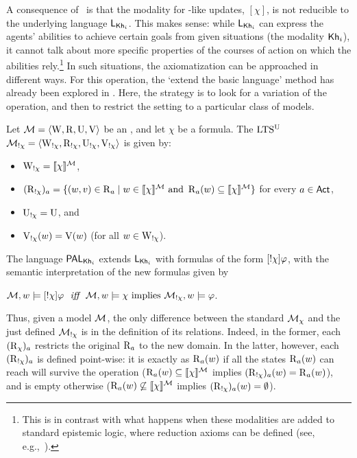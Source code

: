 A consequence of~ is that the modality for \PAL-like updates, $[\chi]$, is not reducible to the underlying language $\mathsf{L}_{{\sf Kh}_i}$. This makes sense: while $\mathsf{L}_{{\sf Kh}_i}$ can express the agents' abilities to achieve certain goals from given situations (the modality ${\sf Kh}_i$), it cannot talk about more specific properties of the courses of action on which the abilities rely.\footnote{This is in contrast with what happens when these modalities are added to standard epistemic logic, where reduction axioms can be defined (see, e.g.,~\cite{DELbook}).} In such situations, the axiomatization can be approached in different ways. For this operation, the `extend the basic language' method has already been explored in \cite{Wang2016}. Here, the strategy is to look for a variation of the operation, and then to restrict the setting to a particular class of models.

\medskip

\begin{definition}\label{def:annupdate}\label{def:pakhsyntax}
Let $\mathcal{M} = \langle \operatorname{W}, \operatorname{R}, \operatorname{U}, \operatorname{V} \rangle$ be an \ults, and let $\chi$ be a formula. The $\textup{LTS$^\text{\textup{U}}$}$ $\mathcal{M}_{!\chi} = \langle \operatorname{W}_{!\chi}, \operatorname{R}_{!\chi}, \operatorname{U}_{!\chi}, \operatorname{V}_{!\chi} \rangle$ is given by:
\begin{itemize}
\item $\operatorname{W}_{!\chi} = \llbracket \chi \rrbracket^{\mathcal{M}}$,
\item $(\operatorname{R}_{!\chi})_a = \{ (w,v) \in \operatorname{R}_a \mid w \in \llbracket \chi \rrbracket^{\mathcal{M}} \text{ and } \operatorname{R}_a(w) \subseteq \llbracket \chi \rrbracket^{\mathcal{M}} \}$ for every $a \in {\rm \sf Act}$,
\item $\operatorname{U}_{!\chi} = \operatorname{U}$, and 
\item $\operatorname{V}_{!\chi}(w) = \operatorname{V}(w)$ (for all $w\in\operatorname{W}_{!\chi}$).
\end{itemize}
\smallskip
The language $\mathsf{PAL}_{{\sf Kh}_i}$ extends $\mathsf{L}_{{\sf Kh}_i}$ with formulas of the form $[!\chi]\varphi$, with the semantic interpretation of the new formulas given by
\begin{spcenter}
	$\modults,w \models \gann{\chi}\varphi \ \ \iff \ \ \modults,w \models \chi \mbox{ implies } \annmodelchi,w \models \varphi$.
\end{spcenter}
\end{definition}

Thus, given a model $\mathcal{M}$, the only difference between the standard $\mathcal{M}_{\chi}$ and the just defined $\mathcal{M}_{!\chi}$ is in the definition of 
its relations. Indeed, in the former, each $(\operatorname{R}_\chi)_a$ restricts the original $\operatorname{R}_a$ to the new domain. In the latter, however, each $(\operatorname{R}_{!\chi})_a$ is defined point-wise: it is exactly as $\operatorname{R}_a(w)$ if all the states $\operatorname{R}_a(w)$ can reach will survive the operation ($\operatorname{R}_a(w) \subseteq \llbracket \chi \rrbracket^{\mathcal{M}}$ implies $(\operatorname{R}_{!\chi})_a(w) = \operatorname{R}_a(w)$), and is empty otherwise ($\operatorname{R}_a(w) \not \subseteq \llbracket \chi \rrbracket^{\mathcal{M}}$ implies $(\operatorname{R}_{!\chi})_a(w) = \emptyset$).

